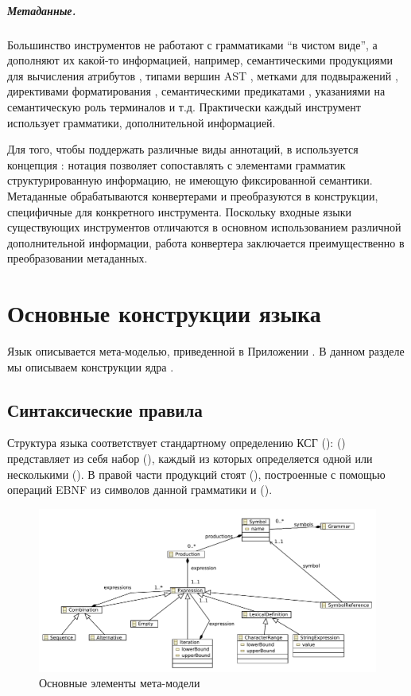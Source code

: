 \paragraph{Метаданные.}
Большинство инструментов не работают с грамматиками ``в чистом виде'', а дополняют их какой-то информацией, например, семантическими продукциями для вычисления атрибутов \cite{LISA}, типами вершин AST \cite{xText}, метками для подвыражений \cite{Rats!}, директивами форматирования \cite{Pretzel}, семантическими предикатами \cite{ANTLR}, указаниями на семантическую роль терминалов \cite{ASF+SDF} и т.д. Практически каждый инструмент использует грамматики,  дополнительной информацией. 

Для того, чтобы поддержать различные виды аннотаций, в \GRM{} используется концепция : нотация позволяет сопоставлять с элементами грамматик структурированную информацию, не имеющую фиксированной семантики. Метаданные обрабатываются конвертерами и преобразуются в конструкции, специфичные для конкретного инструмента. Поскольку входные языки существующих инструментов отличаются в основном использованием различной дополнительной информации, работа конвертера заключается преимущественно в преобразовании метаданных.

\chapter{Основные конструкции языка}

Язык  описывается мета-моделью, приведенной в Приложении . В данном разделе мы описываем конструкции ядра .

\section{Синтаксические правила}

Структура языка соответствует стандартному определению КСГ ():  () представляет из себя набор  (), каждый из которых определяется одной или несколькими  (). В правой части продукций стоят  (), построенные с помощью операций EBNF из символов данной грамматики и  ().

\begin{figure}[htbp]
\includegraphics[width=\textwidth]{grammar.pdf}
\caption{Основные элементы мета-модели }\label{GCore}
\end{figure}


